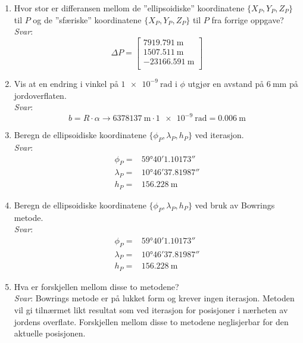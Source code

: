 \documentclass[a4paper, norsk, 11pt, twoside]{article}
\begin{document}
\begin{enumerate}
\begin{enumerate}
  \item Hvor stor er differansen mellom de ''ellipsoidiske'' koordinatene $\{X_{P},Y_{P},Z_{P}\}$ til $P$ og de ''sfæriske'' koordinatene $\{X_{P},Y_{P},Z_{P}\}$ til $P$ fra forrige oppgave?\\
  \textit{Svar}:
  \begin{equation*}
    \Delta P=
    \begin{bmatrix}
      \SI{7919.791}{\meter}\\
      \SI{1507.511}{\meter}\\
      \SI{-23166.591}{\meter}\\
    \end{bmatrix}
  \end{equation*}    
  
  \item Vis at en endring i vinkel på $\SI{1e-9}{\radian}$ i $\phi$ utgjør en avstand på $\SI{6}{\milli\meter}$ på jordoverflaten.\\
  \textit{Svar}:
  \begin{equation*}
    b=R \cdot \alpha \rightarrow \SI{6378137}{\meter} \cdot \SI{1e-9}{\radian}=\SI{0.006}{\meter}
  \end{equation*}    
  
  \item Beregn de ellipsoidiske koordinatene $\{\phi_{P},\lambda_{P},h_{P}\}$ ved iterasjon.\\
  \textit{Svar}:
  \begin{align*}
    \phi_{P}=&\ang{59;40;1.10173}\\
    \lambda_{P}=&\ang{10;46;37.81987}\\
    h_{P}=&\SI{156.228}{\meter}
  \end{align*}    
  
  \item Beregn de ellipsoidiske koordinatene $\{\phi_{P},\lambda_{P},h_{P}\}$ ved bruk av Bowrings metode.\\
  \textit{Svar}:
  \begin{align*}
    \phi_{P}=&\ang{59;40;1.10173}\\
    \lambda_{P}=&\ang{10;46;37.81987}\\
    h_{P}=&\SI{156.228}{\meter}
  \end{align*} 
  
  \item Hva er forskjellen mellom disse to metodene?\\
  \textit{Svar}: Bowrings metode er på lukket form og krever ingen iterasjon. Metoden vil gi tilnærmet likt resultat som ved iterasjon for posisjoner i nærheten av jordens overflate. Forskjellen mellom disse to metodene neglisjerbar for den aktuelle posisjonen.
  \end{enumerate}
\end{enumerate}
\end{document}
